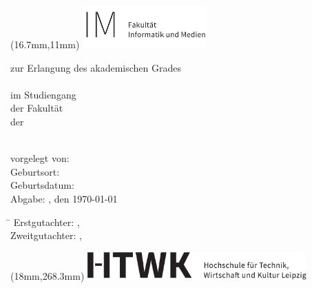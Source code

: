 

\begin{titlepage}
	\noindent
\begin{textblock*}{4.74cm}(16.7mm,11mm)
\includegraphics[width=4.74cm]{anlagen/bilder/logos/HTWK-Fakultaetszusatz_IM_schwarz_de-eps-converted-to.pdf}
\end{textblock*}
\begin{center}

\vspace*{0.5cm}

\large
{\textsc{\Large \abschlussarbeit}}

\vspace*{0.5cm}
zur Erlangung des akademischen Grades\\[0.6cm]
\studienganggrad\\[0.6cm]
im Studiengang \studiengang\\
der Fakultät \fakultaet\\
der \hochschule\ \ort\\

{\LARGE \textbf{\titel}}\\
{\LARGE \textbf{\subtitel}}

\end{center}


\vspace*{2cm}
vorgelegt von: \autor\\
Geburtsort: \geburtsort\\
Geburtsdatum: \geburtstag\\
Abgabe: \ort, den \today


\vspace*{1cm}
\large
\begin{tabbing}
\hspace{4cm}\=\kill
Erstgutachter:  \> \erstgutachter, \instituteErstgutachter\\ 
Zweitgutachter: \> \zweitgutachter, \instituteZweitgutachter\\
\end{tabbing} 

\begin{textblock*}{8.41cm}(18mm,268.3mm)
\includegraphics[width=8.41cm]{anlagen/bilder/logos/htwk-logo-eps-converted-to.pdf}
\end{textblock*}

\end{titlepage}
